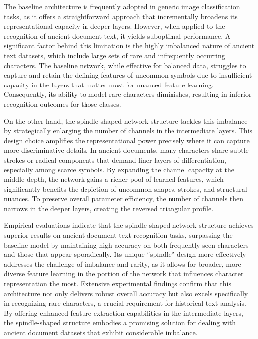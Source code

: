 The baseline architecture is frequently adopted in generic image classification tasks, as it offers a straightforward approach that incrementally broadens its representational capacity in deeper layers. However, when applied to the recognition of ancient document text, it yields suboptimal performance. A significant factor behind this limitation is the highly imbalanced nature of ancient text datasets, which include large sets of rare and infrequently occurring characters. The baseline network, while effective for balanced data, struggles to capture and retain the defining features of uncommon symbols due to insufficient capacity in the layers that matter most for nuanced feature learning. Consequently, its ability to model rare characters diminishes, resulting in inferior recognition outcomes for those classes.

 On the other hand, the spindle-shaped network structure tackles this imbalance by strategically enlarging the number of channels in the intermediate layers. This design choice amplifies the representational power precisely where it can capture more discriminative details. In ancient documents, many characters share subtle strokes or radical components that demand finer layers of differentiation, especially among scarce symbols. By expanding the channel capacity at the middle depth, the network gains a richer pool of learned features, which significantly benefits the depiction of uncommon shapes, strokes, and structural nuances. To preserve overall parameter efficiency, the number of channels then narrows in the deeper layers, creating the reversed triangular profile.

Empirical evaluations indicate that the spindle-shaped network structure achieves superior results on ancient document text recognition tasks, surpassing the baseline model by maintaining high accuracy on both frequently seen characters and those that appear sporadically. Its unique “spindle” design more effectively addresses the challenge of imbalance and rarity, as it allows for broader, more diverse feature learning in the portion of the network that influences character representation the most. Extensive experimental findings confirm that this architecture not only delivers robust overall accuracy but also excels specifically in recognizing rare characters, a crucial requirement for historical text analysis. By offering enhanced feature extraction capabilities in the intermediate layers, the spindle-shaped structure embodies a promising solution for dealing with ancient document datasets that exhibit considerable imbalance.

